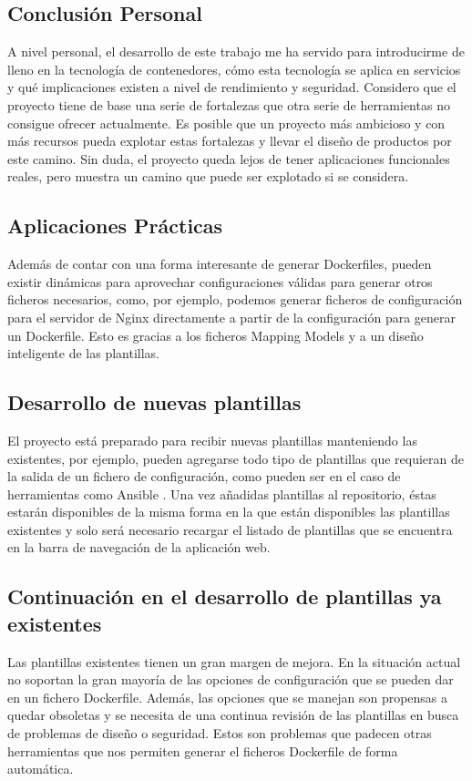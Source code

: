 \documentclass[12pt, a4paper, twoside]{article}
\begin{document}
\subsection{Conclusión Personal}
A nivel personal, el desarrollo de este trabajo me ha servido para introducirme de lleno en la tecnología de contenedores, cómo esta tecnología se aplica en servicios y qué implicaciones existen a nivel de rendimiento y seguridad. Considero que el proyecto tiene de base una serie de fortalezas que otra serie de herramientas no consigue ofrecer actualmente. Es posible que un proyecto más ambicioso y con más recursos pueda explotar estas fortalezas y llevar el diseño de productos por este camino.
Sin duda, el proyecto queda lejos de tener aplicaciones funcionales reales, pero muestra un camino que puede ser explotado si se considera. 
\subsection{Aplicaciones Prácticas}
Además de contar con una forma interesante de generar Dockerfiles, pueden existir dinámicas para aprovechar configuraciones válidas para generar otros ficheros necesarios, como, por ejemplo, podemos generar ficheros de configuración para el servidor de Nginx \cite{nginx} directamente a partir de la configuración para generar un Dockerfile. 
Esto es gracias a los ficheros Mapping Models y a un diseño inteligente de las plantillas.
\subsection{Desarrollo de nuevas plantillas}
El proyecto está preparado para recibir nuevas plantillas manteniendo las existentes, por ejemplo, pueden agregarse todo tipo de plantillas que requieran de la salida de un fichero de configuración, como pueden ser en el caso de herramientas como Ansible \cite{ansible}.	 
Una vez añadidas plantillas al repositorio, éstas estarán disponibles de la misma forma en la que están disponibles las plantillas existentes y solo será necesario recargar el listado de plantillas que se encuentra en la barra de navegación de la aplicación web.	
\subsection{Continuación en el desarrollo de plantillas ya existentes}
Las plantillas existentes tienen un gran margen de mejora. En la situación actual no soportan la gran mayoría de las opciones de configuración que se pueden dar en un fichero Dockerfile. Además, las opciones que se manejan son propensas a quedar obsoletas y se necesita de una continua revisión de las plantillas en busca de problemas de diseño o seguridad.
Estos son problemas que padecen otras herramientas que nos permiten generar el ficheros Dockerfile de forma automática.
\end{document}
